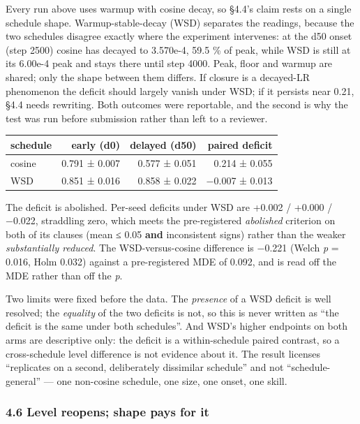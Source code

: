 \documentclass[11pt]{article}
\begin{document}
Every run above uses warmup with cosine decay, so §4.4's claim rests on a single schedule
shape. Warmup-stable-decay (WSD) separates the readings, because the two schedules disagree
exactly where the experiment intervenes: at the d50 onset (step 2500) cosine has decayed to
3.570e-4, 59.5 \% of peak, while WSD is still at its 6.00e-4 peak and stays there until step
4000. Peak, floor and warmup are shared; only the shape between them differs. If closure is
a decayed-LR phenomenon the deficit should largely vanish under WSD; if it persists near
0.21, §4.4 needs rewriting. Both outcomes were reportable, and the second is why the test
was run before submission rather than left to a reviewer.

\begin{table}[t]
\centering\small
\begin{tabular}{@{}lrrr@{}}
\toprule\noalign{}
schedule & early (d0) & delayed (d50) & paired deficit \\
\midrule\noalign{}

cosine & 0.791 ± 0.007 & 0.577 ± 0.051 & 0.214 ± 0.055 \\
WSD & 0.851 ± 0.016 & 0.858 ± 0.022 & −0.007 ± 0.013 \\
\bottomrule
\end{tabular}
\end{table}


The deficit is abolished. Per-seed deficits under WSD are +0.002 / +0.000 / −0.022,
straddling zero, which meets the pre-registered \emph{abolished} criterion on both of its clauses
(mean ≤ 0.05 \textbf{and} inconsistent signs) rather than the weaker \emph{substantially reduced}. The
WSD-versus-cosine difference is −0.221 (Welch \emph{p} = 0.016, Holm 0.032) against a
pre-registered MDE of 0.092, and is read off the MDE rather than off the \emph{p}.

Two limits were fixed before the data. The \emph{presence} of a WSD deficit is well resolved; the
\emph{equality} of the two deficits is not, so this is never written as ``the deficit is the same
under both schedules''. And WSD's higher endpoints on both arms are descriptive only: the
deficit is a within-schedule paired contrast, so a cross-schedule level difference is not
evidence about it. The result licenses ``replicates on a second, deliberately dissimilar
schedule'' and not ``schedule-general'' --- one non-cosine schedule, one size, one onset, one
skill.

\subsubsection{4.6 Level reopens; shape pays for it}\label{level-reopens-shape-pays-for-it}
\end{document}
